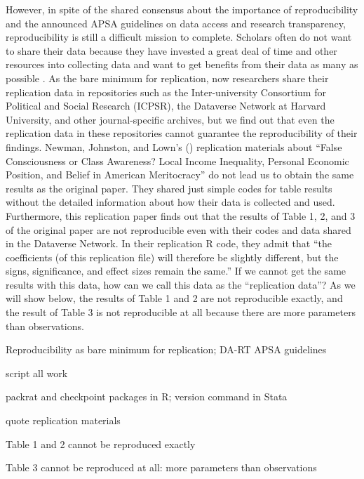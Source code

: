 However, in spite of the shared consensus about the importance of reproducibility and the announced APSA guidelines on data access and research transparency, reproducibility is still a difficult mission to complete. Scholars often do not want to share their data because they have invested a great deal of time and other resources into collecting data and want to get benefits from their data as many as possible \citep{Lupia2014}. As the bare minimum for replication, now researchers share their replication data in repositories such as the Inter-university Consortium for Political and Social Research (ICPSR), the Dataverse Network at Harvard University, and other journal-specific archives, but we find out that even the replication data in these repositories cannot guarantee the reproducibility of their findings. Newman, Johnston, and Lown's (\citeyear{Newman2015a}) replication materials about ``False Consciousness or Class Awareness? Local Income Inequality, Personal Economic Position, and Belief in American Meritocracy'' do not lead us to obtain the same results as the original paper. They shared just simple codes for table results without the detailed information about how their data is collected and used. Furthermore, this replication paper finds out that the results of Table 1, 2, and 3 of the original paper are not reproducible even with their codes and data shared in the Dataverse Network. In their replication R code, they admit that ``the coefficients (of this replication file) will therefore be slightly different, but the signs, significance, and effect sizes remain the same.'' If we cannot get the same results with this data, how can we call this data as the ``replication data''? As we will show below, the results of Table 1 and 2 are not reproducible exactly, and the result of Table 3 is not reproducible at all because there are more parameters than observations. 


Reproducibility as bare minimum for replication; DA-RT APSA guidelines

script all work

packrat and checkpoint packages in R; version command in Stata

quote \citet{Newman2015} replication materials

Table 1 and 2 cannot be reproduced exactly

Table 3 cannot be reproduced at all: more parameters than observations

